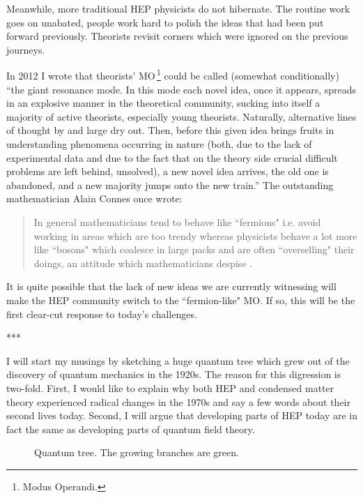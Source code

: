 \documentclass[epsfig,12pt]{article}
\begin{document}
Meanwhile, more traditional  HEP physicists do not hibernate. The routine work goes on unabated, people work hard to polish the ideas that had been put forward previously.
Theorists revisit corners which were ignored on the previous journeys.

In 2012 I wrote that theorists' MO\,\footnote{Modus Operandi.} could be called (somewhat conditionally) ``the giant resonance mode. In this mode each novel idea, once it appears, spreads  in an explosive manner in the theoretical community, sucking into itself a majority of active theorists, especially young theorists. Naturally, alternative lines of thought by and large dry out. Then, before this given idea brings fruits in understanding phenomena occurring in nature (both, due to the lack of experimental data and due to the fact that on the theory side 
crucial difficult problems are left behind, unsolved), a new novel idea arrives, the old one is abandoned, and a new majority jumps onto the new train.''  The outstanding mathematician Alain Connes once wrote:

\begin{quotation}

In general mathematicians tend to behave like
 ``fermions" i.e. avoid working in areas which are too trendy whereas physicists behave a lot more like ``bosons" which coalesce in large packs and are often ``overselling" their doings, an attitude which mathematicians despise \cite{connes}. 
 
 \end{quotation}
 \noindent
It is quite possible that 
the lack of new ideas  we are currently witnessing will make the HEP community switch to the ``fermion-like" MO. If so, this  will be the first clear-cut response to today's  challenges.

\vspace{2mm}

\centerline{***}

I will start my musings by sketching  a huge quantum tree which grew out of the discovery of quantum mechanics in the 1920s. The reason for this digression is two-fold.
First, I would like to explain why both HEP  and condensed matter theory experienced radical changes in the 1970s and say a few words 
about their second lives today.  Second, I will argue that developing parts of HEP today are in fact the same as developing parts of quantum field theory. 


\begin{figure}[h]
\epsfxsize=10cm
\centerline{}
\vspace{-1.5mm}
\caption{\small
Quantum tree. The growing branches are green.  }
\label{figu3}
\end{figure}
\end{document}

